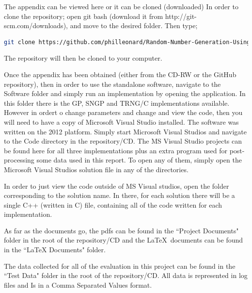 \documentclass[a4paper,10.5pt]{article}
\begin{document}
The appendix can be viewed here or it can be cloned (downloaded) In order to clone the repository; open git bash (download it from http://git-scm.com/downloads), and move to the desired folder. Then type;

\begin{lstlisting}[language=bash]
git clone https://github.com/philleonard/Random-Number-Generation-Using-Genetic-Programming.git
\end{lstlisting}

The repository will then be cloned to your computer. 

Once the appendix has been obtained (either from the CD-RW or the GitHub repository), then in order to use the standalone software, navigate to the Software folder and simply run an implementation by opening the application. In this folder there is the GP, SNGP and TRNG/C implementations available. However in ordert o change parameters and change and view the code, then you will need to have a copy of Microsoft Visual Studio installed. The software was written on the 2012 platform. Simply start Microsoft Visual Studios and navigate to the Code directory in the repository/CD. The MS Visual Studio projects can be found here for all three implementations plus an extra program used for post-processing some data used in this report. To open any of them, simply open the Microsoft Visual Studios solution file in any of the directories.

In order to just view the code outside of MS Visual studios, open the folder corresponding to the solution name. In there, for each solution there will be a single C++ (written in C) file, containing all of the code written for each implementation.

As far as the documents go, the pdfs can be found in the ``Project Documents" folder in the root of the repository/CD and the \LaTeX\ documents can be found in the ``LaTeX Documents" folder. 

The data collected for all of the evaluation in this project can be found in the ``Test Data" folder in the root of the repository/CD. All data is represented in log files and Is in a Comma Separated Values format.
\end{document}

